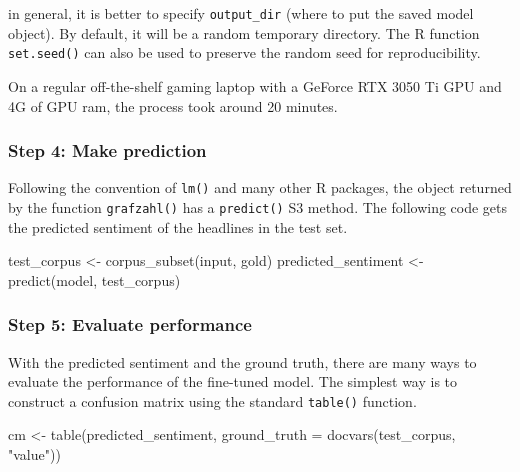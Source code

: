 \documentclass[
]{ccr}
\newenvironment{Shaded}{\begin{snugshade}}{\end{snugshade}}
\newcommand{\AttributeTok}[1]{\textcolor[rgb]{0.40,0.45,0.13}{#1}}
\newcommand{\FunctionTok}[1]{\textcolor[rgb]{0.28,0.35,0.67}{#1}}
\newcommand{\NormalTok}[1]{\textcolor[rgb]{0.00,0.23,0.31}{#1}}
\newcommand{\OtherTok}[1]{\textcolor[rgb]{0.00,0.23,0.31}{#1}}
\newcommand{\StringTok}[1]{\textcolor[rgb]{0.13,0.47,0.30}{#1}}
\begin{document}
in general, it is better to specify \texttt{output\_dir} (where to put
the saved model object). By default, it will be a random temporary
directory. The R function \texttt{set.seed()} can also be used to
preserve the random seed for reproducibility.

On a regular off-the-shelf gaming laptop with a GeForce RTX 3050 Ti GPU
and 4G of GPU ram, the process took around 20 minutes.

\hypertarget{step-4-make-prediction}{%
\subsubsection{Step 4: Make prediction}\label{step-4-make-prediction}}

Following the convention of \texttt{lm()} and many other R packages, the
object returned by the function \texttt{grafzahl()} has a
\texttt{predict()} S3 method. The following code gets the predicted
sentiment of the headlines in the test set.

\begin{Shaded}
\begin{Highlighting}[]
\NormalTok{test\_corpus }\OtherTok{\textless{}{-}} \FunctionTok{corpus\_subset}\NormalTok{(input, gold)}
\NormalTok{predicted\_sentiment }\OtherTok{\textless{}{-}} \FunctionTok{predict}\NormalTok{(model, test\_corpus)}
\end{Highlighting}
\end{Shaded}

\hypertarget{step-5-evaluate-performance}{%
\subsubsection{Step 5: Evaluate
performance}\label{step-5-evaluate-performance}}

With the predicted sentiment and the ground truth, there are many ways
to evaluate the performance of the fine-tuned model. The simplest way is
to construct a confusion matrix using the standard \texttt{table()}
function.

\begin{Shaded}
\begin{Highlighting}[]
\NormalTok{cm }\OtherTok{\textless{}{-}} \FunctionTok{table}\NormalTok{(predicted\_sentiment,}
            \AttributeTok{ground\_truth =} \FunctionTok{docvars}\NormalTok{(test\_corpus, }\StringTok{"value"}\NormalTok{))}
\end{Highlighting}
\end{Shaded}
\end{document}
